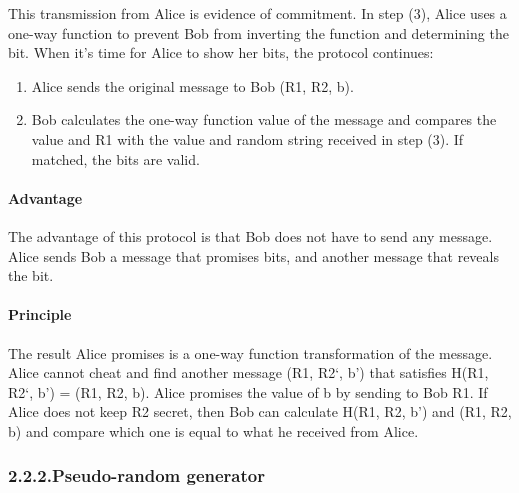 \documentclass{article}
\begin{document}
\noindent{}This transmission from Alice is evidence of commitment. In step (3), Alice uses a one-way function to prevent Bob from inverting the function and determining the bit. When it's time for Alice to show her bits, the protocol continues:%

\begin{enumerate}[noitemsep,topsep=\mdcompacttopsep,start=4]%

\item{}Alice sends the original message to Bob (R1, R2, b).%

\item{}Bob calculates the one-way function value of the message and compares the value and R1 with the value and random string received in step (3). If matched, the bits are valid.%
\end{enumerate}%

\paragraph{Advantage}\label{sec-advantage}%

\noindent{}The advantage of this protocol is that Bob does not have to send any message. Alice sends Bob a message that promises bits, and another message that reveals the bit.%

\paragraph{Principle}\label{sec-principle}%

\noindent{}The result Alice promises is a one-way function transformation of the message. Alice cannot cheat and find another message (R1, R2\textquoteleft{}, b\textquoteright{}) that satisfies H(R1, R2\textquoteleft{}, b\textquoteright{}) = (R1, R2, b). Alice promises the value of b by sending to Bob R1. If Alice does not keep R2 secret, then Bob can calculate H(R1, R2, b’) and (R1, R2, b) and compare which one is equal to what he received from Alice.%

\subsubsection{2.2.2.\hspace*{0.5em}Pseudo-random generator}\label{sec-pseudo-random-generator}%
\end{document}
